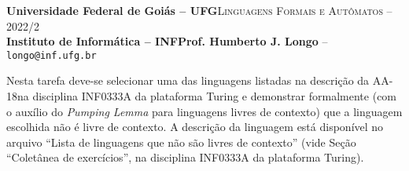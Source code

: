 \documentclass[12pt]{article}
\def\ua{18}
\begin{document}
 \begin{tcolorbox}[rounded corners, colback=blue!3, colframe=blue!40!black]
  \footnotesize\textbf{Universidade Federal de Goiás -- UFG}\hfill \textsc{Linguagens Formais e Autômatos -- 2022/2}\\
  \footnotesize\textbf{Instituto de Informática -- INF\hfill Prof. Humberto J. Longo} -- \scriptsize\texttt{longo@inf.ufg.br}
 \end{tcolorbox}\bigskip
%
\begin{tcolorbox}[rounded corners, colback=blue!2, colframe=blue!40!black, title=\textbf{Atividade AA-\ua}]
 Nesta tarefa deve-se selecionar uma das linguagens listadas na descrição da AA-\ua na disciplina INF0333A da plataforma Turing e demonstrar formalmente (com o auxílio do \emph{Pumping Lemma} para linguagens livres de contexto) que a linguagem escolhida não é livre de contexto. A descrição da linguagem está disponível no arquivo ``Lista de linguagens que não são livres de contexto'' (vide Seção ``Coletânea de exercícios'', na disciplina INF0333A da plataforma Turing).
\end{tcolorbox}\bigskip
\end{document}
